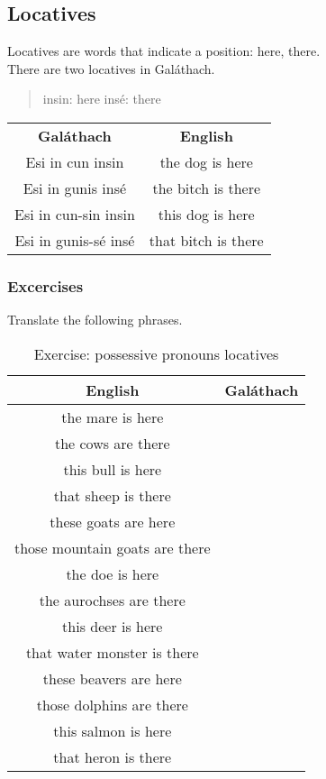\subsection{Locatives}

Locatives are words that indicate a position: here, there.\\
There are two locatives in Gal\'{a}thach.
\begin{quote}
insin: here
ins\'{e}: there
\end{quote}

\begin{table}[H]
\centering
\begin{tabular}{cc}
  \toprule
  \textbf{Gal\'{a}thach} & \textbf{English}\\
  \cmidrule(lr){1-1}\cmidrule(lr){2-2}
  Esi in cun insin & the dog is here\\
  Esi in gunis ins\'{e} & the bitch is there\\
  Esi in cun-sin insin & this dog is here\\
  Esi in gunis-s\'{e} ins\'{e} & that bitch is there\\
  \bottomrule
\end{tabular}
\label{examples_locatives}
\end{table}

\subsubsection{Excercises}

Translate the following phrases.
\begin{table}[H]
\centering
\begin{tabular}{|c|M{5.0cm}|}
  \toprule
  \textbf{English} & \textbf{Gal\'{a}thach}\\
  \toprule
  the mare is here & \\
  \midrule
  the cows are there & \\
  \midrule
  this bull is here & \\
  \midrule
  that sheep is there & \\
  \midrule
  these goats are here & \\
  \midrule
  those mountain goats are there & \\
  \midrule
  the doe is here & \\
  \midrule
  the aurochses are there & \\
  \midrule
  this deer is here & \\
  \midrule
  that water monster is there & \\
  \midrule
  these beavers are here & \\
  \midrule
  those dolphins are there & \\
  \midrule
  this salmon is here & \\
  \midrule
  that heron is there & \\
  \bottomrule
\end{tabular}
\label{exercise_possessive_pronouns_locatives}
\caption{Exercise: possessive pronouns locatives}
\end{table}

